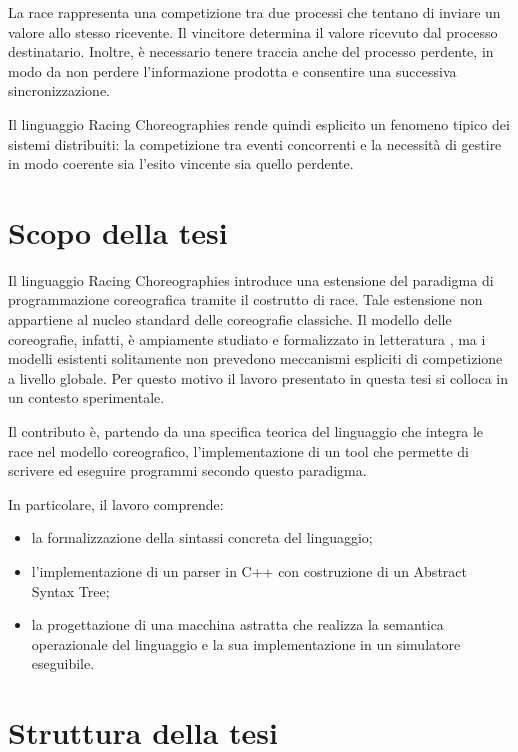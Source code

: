 La race rappresenta una competizione tra due processi che tentano di inviare un valore allo stesso ricevente. Il vincitore determina il valore ricevuto dal processo destinatario. Inoltre, è necessario tenere traccia anche del processo perdente, in modo da non perdere l’informazione prodotta e consentire una successiva sincronizzazione.

Il linguaggio Racing Choreographies rende quindi esplicito un fenomeno tipico dei sistemi distribuiti: la competizione tra eventi concorrenti e la necessità di gestire in modo coerente sia l’esito vincente sia quello perdente.

\section{Scopo della tesi}

Il linguaggio Racing Choreographies introduce una estensione del paradigma di programmazione coreografica tramite il costrutto di race. Tale estensione non appartiene al nucleo standard delle coreografie classiche. Il modello delle coreografie, infatti, è ampiamente studiato e formalizzato in letteratura \cite{montesi2023choreographies,honda2016foundations}, ma i modelli esistenti solitamente non prevedono meccanismi espliciti di competizione a livello globale. Per questo motivo il lavoro presentato in questa tesi si colloca in un contesto sperimentale.

Il contributo è, partendo da una specifica teorica del linguaggio che integra le race nel modello coreografico, l’implementazione di un tool che permette di scrivere ed eseguire programmi secondo questo paradigma.

In particolare, il lavoro comprende:

\begin{itemize}
\item la formalizzazione della sintassi concreta del linguaggio;
\item l’implementazione di un parser in C++ con costruzione di un Abstract Syntax Tree;
\item la progettazione di una macchina astratta che realizza la semantica operazionale del linguaggio e la sua implementazione in un simulatore eseguibile.
\end{itemize}

\section{Struttura della tesi}

